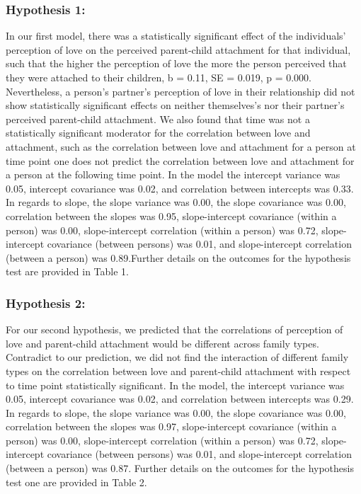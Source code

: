 \documentclass[man]{apa6}
\begin{document}
\hypertarget{hypothesis-1}{%
\subsubsection{Hypothesis 1:}\label{hypothesis-1}}

In our first model, there was a statistically significant effect of the individuals' perception of love on the perceived parent-child attachment for that individual, such that the higher the perception of love the more the person perceived that they were attached to their children, b = 0.11, SE = 0.019, p = 0.000. Nevertheless, a person's partner's perception of love in their relationship did not show statistically significant effects on neither themselves's nor their partner's perceived parent-child attachment. We also found that time was not a statistically significant moderator for the correlation between love and attachment, such as the correlation between love and attachment for a person at time point one does not predict the correlation between love and attachment for a person at the following time point. In the model the intercept variance was 0.05, intercept covariance was 0.02, and correlation between intercepts was 0.33. In regards to slope, the slope variance was 0.00, the slope covariance was 0.00, correlation between the slopes was 0.95, slope-intercept covariance (within a person) was 0.00, slope-intercept correlation (within a person) was 0.72, slope-intercept covariance (between persons) was 0.01, and slope-intercept correlation (between a person) was 0.89.Further details on the outcomes for the hypothesis test are provided in Table 1.

\hypertarget{hypothesis-2}{%
\subsubsection{Hypothesis 2:}\label{hypothesis-2}}

For our second hypothesis, we predicted that the correlations of perception of love and parent-child attachment would be different across family types. Contradict to our prediction, we did not find the interaction of different family types on the correlation between love and parent-child attachment with respect to time point statistically significant. In the model, the intercept variance was 0.05, intercept covariance was 0.02, and correlation between intercepts was 0.29. In regards to slope, the slope variance was 0.00, the slope covariance was 0.00, correlation between the slopes was 0.97, slope-intercept covariance (within a person) was 0.00, slope-intercept correlation (within a person) was 0.72, slope-intercept covariance (between persons) was 0.01, and slope-intercept correlation (between a person) was 0.87. Further details on the outcomes for the hypothesis test one are provided in Table 2.
\end{document}
